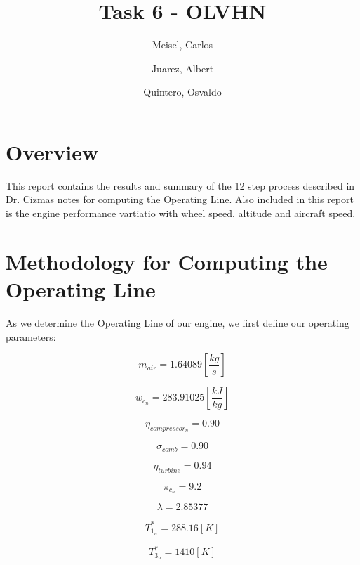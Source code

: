 \documentclass[titlepage]{article}
\author{
    Meisel, Carlos \\
  \and
  Juarez, Albert\\
  \and
    Quintero, Osvaldo\\
}
\title{Task 6 - OLVHN}
\begin{document}
  \maketitle

  \tableofcontents

\section{Overview}
This report contains the results and summary of the 12 step process described in Dr. Cizmas notes for computing the Operating Line. 
Also included in this report is the engine performance vartiatio with wheel speed, altitude and aircraft speed.

\section{Methodology for Computing the Operating Line}
As  we determine the Operating Line of our engine, we first define our 
operating parameters:

\begin{equation}
  \dot{m}_{air} = 1.64089 \left[\frac{kg}{s} \right]
\end{equation}

\begin{equation}
  w_{c_{n}} = 283.91025 \left[\frac{kJ}{kg}\right]
\end{equation}

\begin{equation}
  \eta_{compressor_{n}} = 0.90
\end{equation}

\begin{equation}
  \sigma_{comb} = 0.90
\end{equation}

\begin{equation}
  \eta_{turbine} = 0.94
\end{equation}

\begin{equation}
  \pi_{c_{n}} = 9.2
\end{equation}

\begin{equation}
  \lambda = 2.85377
\end{equation}

\begin{equation}
  T_{1_{n}}^{*} = 288.16 [K]
\end{equation}

\begin{equation}
  T_{3_{n}}^{*} = 1410 [K]
\end{equation}
\end{document}
